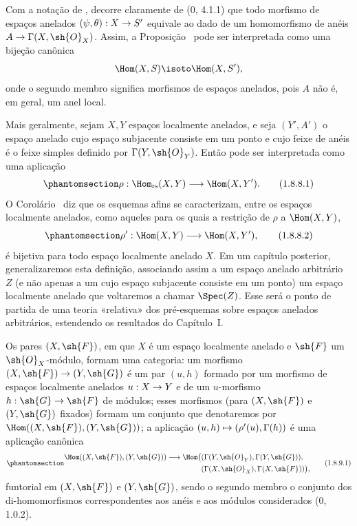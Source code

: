 \documentclass[oneside,10pt]{amsart}
\makeatletter
\newcommand{\ega@arrow}[2]{\mathchoice{#1}{#2}{#2}{#2}}
\let\ega@shortmapsto\mapsto
\renewcommand{\to}{\ega@arrow{\longrightarrow}{\rightarrow}}
\renewcommand{\mapsto}{\ega@arrow{\longmapsto}{\ega@shortmapsto}}
\newcommand{\oldpage}[2][]{\marginnote{\normalfont\footnotesize\textbf{#1}~|~#2}\ignorespaces}
\let\EGAOriginalLabel\label
\renewcommand{\label}[1]{\phantomsection\EGAOriginalLabel{#1}}
\makeatother
\begin{document}
\begin{env}[1.8.8]
\label{ega2:addendum:I.1.8.8}
Com a notação de , decorre claramente de (0, 4.1.1) que
todo morfismo de espaços anelados $(\psi,\theta):X\to S'$ equivale ao
dado de um homomorfismo de anéis $A\to\Gamma(X,\sh{O}_X)$. Assim, a
Proposição~ pode ser interpretada como uma bijeção
canônica
\[
  \Hom(X,S)\isoto\Hom(X,S'),
\]
onde o segundo membro significa morfismos de espaços anelados, pois
$A$ não é, em geral, um anel local.

Mais geralmente, sejam $X,Y$ espaços localmente anelados, e seja
$(Y',A')$ o espaço anelado cujo espaço subjacente consiste em um ponto
e cujo feixe de anéis é o feixe simples definido por
$\Gamma(Y,\sh{O}_Y)$. Então  pode ser interpretada
como uma aplicação
\begin{equation}
\label{ega2:addendum:I.1.8.8.1}
  \rho:\Hom_{\mathrm{rs}}(X,Y)\to\Hom(X,Y').
\tag{1.8.8.1}
\end{equation}
O Corolário~ diz que os esquemas afins se caracterizam,
entre os espaços localmente anelados, como aqueles para os quais a
restrição de $\rho$ a $\Hom(X,Y)$,
\begin{equation}
\label{ega2:addendum:I.1.8.8.2}
  \rho':\Hom(X,Y)\to\Hom(X,Y'),
\tag{1.8.8.2}
\end{equation}
é bijetiva para todo espaço localmente anelado $X$. Em um capítulo
posterior, generalizaremos esta definição, associando assim a um
espaço anelado arbitrário $Z$ (e não apenas a um cujo espaço
subjacente consiste em um ponto) um espaço localmente anelado que
voltaremos a chamar $\Spec(Z)$. Esse será o ponto de partida de uma
teoria «relativa» dos pré-esquemas sobre espaços anelados arbitrários,
estendendo os resultados do Capítulo~I.
\end{env}

\begin{env}[1.8.9]
\label{ega2:addendum:I.1.8.9}
Os pares $(X,\sh{F})$, em que $X$ é um espaço localmente anelado e
$\sh{F}$ um $\sh{O}_X$-módulo, formam uma categoria: um morfismo
$(X,\sh{F})\to(Y,\sh{G})$ é um par $(u,h)$ formado por um morfismo de
\oldpage[II]{221}
espaços localmente anelados $u:X\to Y$ e de um $u$-morfismo
$h:\sh{G}\to\sh{F}$ de módulos; esses
morfismos (para $(X,\sh{F})$ e $(Y,\sh{G})$ fixados) formam um conjunto
que denotaremos por $\Hom((X,\sh{F}),(Y,\sh{G}))$; a aplicação
$(u,h)\mapsto(\rho'(u),\Gamma(h))$ é uma aplicação canônica
\begin{equation}
\label{ega2:addendum:I.1.8.9.1}
\begin{split}
  \Hom((X,\sh{F}),(Y,\sh{G}))\to
  \Hom\bigl(
    &(\Gamma(Y,\sh{O}_Y),\Gamma(Y,\sh{G})),\\
    &(\Gamma(X,\sh{O}_X),\Gamma(X,\sh{F}))
  \bigr),
\end{split}
\tag{1.8.9.1}
\end{equation}
funtorial em $(X,\sh{F})$ e $(Y,\sh{G})$, sendo o segundo membro
o conjunto dos di-homomorfismos correspondentes aos anéis e aos
módulos considerados (0, 1.0.2).
\end{env}
\end{document}
